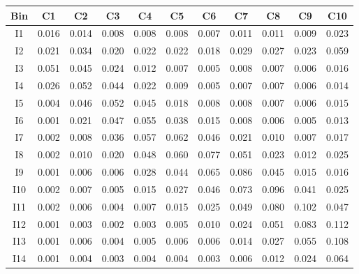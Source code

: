 \begin{tabular}{c@{~~~}c@{~~}c@{~~}c@{~~}c@{~~}c@{~~}c@{~~}c@{~~}c@{~~}c@{~~}c}
\hline
 \hline
Bin	& C1 & C2 & C3 & C4 & C5 & C6 & C7 & C8 & C9 & C10 \\
\hline
I1	&  0.016 &  0.014 &  0.008 &  0.008 &  0.008 &  0.007 &  0.011 &  0.011 &  0.009 &  0.023 \\
I2	&  0.021 &  0.034 &  0.020 &  0.022 &  0.022 &  0.018 &  0.029 &  0.027 &  0.023 &  0.059 \\
I3	&  0.051 &  0.045 &  0.024 &  0.012 &  0.007 &  0.005 &  0.008 &  0.007 &  0.006 &  0.016 \\
I4	&  0.026 &  0.052 &  0.044 &  0.022 &  0.009 &  0.005 &  0.007 &  0.007 &  0.006 &  0.014 \\
I5	&  0.004 &  0.046 &  0.052 &  0.045 &  0.018 &  0.008 &  0.008 &  0.007 &  0.006 &  0.015 \\
I6	&  0.001 &  0.021 &  0.047 &  0.055 &  0.038 &  0.015 &  0.008 &  0.006 &  0.005 &  0.013 \\
I7	&  0.002 &  0.008 &  0.036 &  0.057 &  0.062 &  0.046 &  0.021 &  0.010 &  0.007 &  0.017 \\
I8	&  0.002 &  0.010 &  0.020 &  0.048 &  0.060 &  0.077 &  0.051 &  0.023 &  0.012 &  0.025 \\
I9	&  0.001 &  0.006 &  0.006 &  0.028 &  0.044 &  0.065 &  0.086 &  0.045 &  0.015 &  0.016 \\
I10	&  0.002 &  0.007 &  0.005 &  0.015 &  0.027 &  0.046 &  0.073 &  0.096 &  0.041 &  0.025 \\
I11	&  0.002 &  0.006 &  0.004 &  0.007 &  0.015 &  0.025 &  0.049 &  0.080 &  0.102 &  0.047 \\
I12	&  0.001 &  0.003 &  0.002 &  0.003 &  0.005 &  0.010 &  0.024 &  0.051 &  0.083 &  0.112 \\
I13	&  0.001 &  0.006 &  0.004 &  0.005 &  0.006 &  0.006 &  0.014 &  0.027 &  0.055 &  0.108 \\
I14	&  0.001 &  0.004 &  0.003 &  0.004 &  0.004 &  0.003 &  0.006 &  0.012 &  0.024 &  0.064 \\
\hline
 \hline
\end{tabular}
